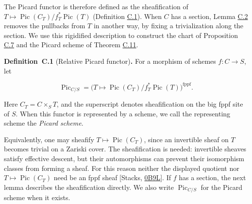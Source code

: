 \documentclass[11pt]{article}
\newenvironment{bpstatement}[2]{\par\addvspace{0.6\baselineskip}\noindent\textbf{#1}#2\textbf{.}\enspace\ignorespaces}
  {\par\addvspace{0.4\baselineskip}}
\begin{document}
The Picard functor is therefore defined as the sheafification of \(T\mapsto\operatorname{Pic}(C_T)/f_T^*\operatorname{Pic}(T)\) (Definition \hyperref[bp5]{C.1}). When \(C\) has a section, Lemma \hyperref[bp7]{C.2} removes the pullbacks from \(T\) in another way, by fixing a trivialization along the section. We use this rigidified description to construct the chart of Proposition \hyperref[bp24]{C.7} and the Picard scheme of Theorem \hyperref[bp36]{C.11}.

\label{bp5}%
\begin{bpstatement}{Definition~C.1}{ (Relative Picard functor)}
For a morphism of schemes \(f:C\to S\), let

\[
\operatorname{Pic}_{C/S}
=\bigl(T\longmapsto
\operatorname{Pic}(C_T)/f_T^*\operatorname{Pic}(T)\bigr)^{\mathrm{fppf}}.
\]

Here \(C_T=C\times_ST\), and the superscript denotes sheafification on the big fppf site of \(S\). When this functor is represented by a scheme, we call the representing scheme the \emph{Picard scheme}.
\end{bpstatement}

\label{bp6}%
Equivalently, one may sheafify \(T\mapsto\operatorname{Pic}(C_T)\), since an invertible sheaf on \(T\) becomes trivial on a Zariski cover. The sheafification is needed: invertible sheaves satisfy effective descent, but their automorphisms can prevent their isomorphism classes from forming a sheaf. For this reason neither the displayed quotient nor \(T\mapsto\operatorname{Pic}(C_T)\) need be an fppf sheaf [Stacks, \href{https://stacks.math.columbia.edu/tag/0B9L}{0B9L}]. If \(f\) has a section, the next lemma describes the sheafification directly. We also write \(\operatorname{Pic}_{C/S}\) for the Picard scheme when it exists.
\end{document}
